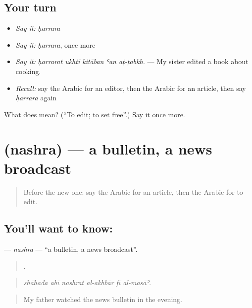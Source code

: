\subsection*{Your turn}
\begin{itemize}
\raggedright
  \item \emph{Say it:} \emph{ḥarrara}
  \item \emph{Say it:} \emph{ḥarrara}, once more
  \item \emph{Say it:} \emph{ḥarrarat ukhtī kitāban ʿan aṭ-ṭabkh.} — My sister edited a book about cooking.
  \item \emph{Recall:} say the Arabic for an editor, then the Arabic for an article, then say \emph{ḥarrara} again
\end{itemize}

\begin{tcolorbox}[breakable,colback=teal!4,colframe=teal!35!black,title={Before you move on}]
What does  mean? (\textquotedblleft{}To edit; to set free\textquotedblright{}.) Say it once more.
\end{tcolorbox}
\section[\texorpdfstring{\ar{نشرة} (nashra)}{نشرة (nashra)}]{ (nashra) — a bulletin, a news broadcast}

\label{lesson:AR-C296-nashra}



\begin{quote}
Before the new one: say the Arabic for an article, then the Arabic for to edit.
\end{quote}

\subsection*{You'll want to know: }
\textbf{} — \emph{nashra} — \textquotedblleft{}a bulletin, a news broadcast\textquotedblright{}.

\begin{quote}
     .
\end{quote}

\begin{quote}
\emph{shāhada abī nashrat al-akhbār fī al-masāʾ.}
\end{quote}

\begin{quote}
My father watched the news bulletin in the evening.
\end{quote}

